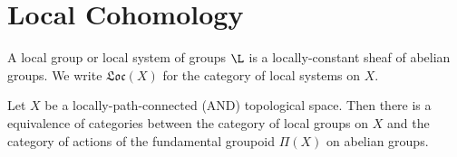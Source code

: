 \documentclass[12pt]{article}
\newcommand{\Loc}[1]{\mathfrak{Loc}\left( #1 \right)}
\begin{document}
\section{Local Cohomology}

\begin{definition}
A local group or local system of groups $\L$ is a locally-constant sheaf of abelian groups. We write $\Loc{X}$ for the category of local systems on $X$.  
\end{definition}

\begin{theorem}
Let $X$ be a locally-path-connected (AND) topological space. Then there is a equivalence of categories between the category of local groups on $X$ and the category of actions of the fundamental groupoid $\Pi(X)$ on abelian groups. 
\end{theorem}
\end{document}
